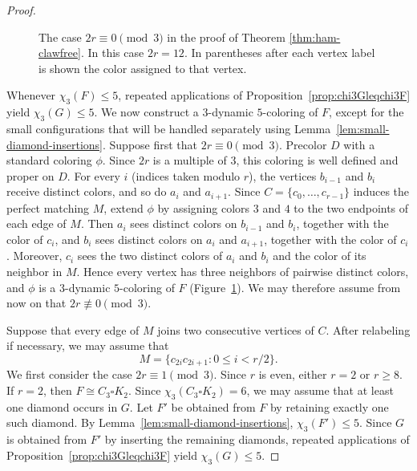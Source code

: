 \documentclass[10pt,a4paper]{article}
\theoremstyle{case}
\numberwithin{subcase}{case}
\begin{document}
\begin{proof}
\begin{figure}[H]

    \caption{The case $2r\equiv0\pmod3$ in the proof of
    Theorem \ref{thm:ham-clawfree}. In this case $2r=12$.
    In parentheses after each vertex label is shown the color
    assigned to that vertex.}
    \label{fig:2requiv0mod3}
\end{figure}

Whenever $\chi_3(F)\leq5$, repeated applications of
Proposition~\ref{prop:chi3Gleqchi3F} yield $\chi_3(G)\leq5$.
We now construct a $3$-dynamic $5$-coloring of $F$, except for the
small configurations that will be handled separately using
Lemma~\ref{lem:small-diamond-insertions}.
Suppose first that $2r\equiv0\pmod3$. Precolor $D$ with a standard
coloring $\phi$. Since $2r$ is a multiple of $3$, this coloring is
well defined and proper on $D$. For every $i$ (indices taken modulo
$r$), the vertices $b_{i-1}$ and $b_i$ receive distinct colors, and
so do $a_i$ and $a_{i+1}$.
Since $C=\{c_0,\ldots,c_{r-1}\}$ induces the perfect matching $M$,
extend $\phi$ by assigning colors $3$ and $4$ to the two endpoints of
each edge of $M$. Then $a_i$ sees distinct colors on $b_{i-1}$ and
$b_i$, together with the color of $c_i$, and $b_i$ sees distinct
colors on $a_i$ and $a_{i+1}$, together with the color of $c_i$.
Moreover, $c_i$ sees the two distinct colors of $a_i$ and $b_i$ and
the color of its neighbor in $M$. Hence every vertex has three
neighbors of pairwise distinct colors, and $\phi$ is a $3$-dynamic
$5$-coloring of $F$ (Figure~\ref{fig:2requiv0mod3}).
We may therefore assume from now on that
$2r\not\equiv0\pmod3$.

Suppose that every edge of $M$ joins two consecutive vertices of $C$.
After relabeling if necessary, we may assume that
\[
M=\{c_{2i}c_{2i+1}:0\leq i<r/2\}.
\]
We first consider the case $2r\equiv1\pmod3$. Since $r$ is even, either
$r=2$ or $r\geq8$.
If $r=2$, then $F\cong C_3\square K_2$. Since
$\chi_3(C_3\square K_2)=6$, we may assume that at least one diamond occurs in $G$.
Let $F'$ be obtained from $F$ by retaining exactly one such diamond.
By Lemma~\ref{lem:small-diamond-insertions},
$\chi_3(F')\leq5$. Since $G$ is obtained from $F'$ by inserting the
remaining diamonds, repeated applications of
Proposition~\ref{prop:chi3Gleqchi3F} yield $\chi_3(G)\leq5$.


\end{proof}
\end{document}

